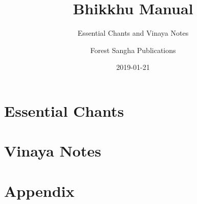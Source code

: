 \documentclass[
  final,
  babelLanguage=british,
  desktopVersion,
]{anecdote}
\title{Bhikkhu Manual}
\subtitle{Essential Chants and Vinaya Notes}
\author{Forest Sangha Publications}
\date{2019-01-21}%
\begin{document}
\frontmatter










\cleartorecto
\pagestyle{toponerow-frontmatter}
\tableofcontents*

\clearpage
\listfirstlines*



\mainmatter
\pagestyle{toponerow}

\cleartorecto
\part{Essential Chants}

{\raggedright











}

\cleartorecto
\part{Vinaya Notes}










\appendix

\cleartorecto
\part{Appendix}




\backmatter





\emptypage%
\end{document}
